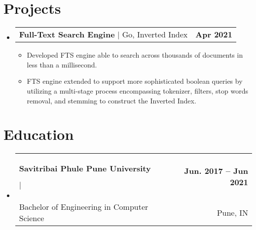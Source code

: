 \documentclass[letterpaper,11pt]{article}
\makeatletter
\newcommand{\resumeItem}[1]{
  \item\small{
    {#1 \vspace{-2pt}}
  }
}
\newcommand{\resumeSubheading}[5]{
  \vspace{-2pt}\item
    \begin{tabular*}{1.0\textwidth}[t]{l@{\extracolsep{\fill}}r}
      \textbf{#1}

        \if\relax\detokenize{#2}\relax
        \else
            $|$ \small{#2}
        \fi

        & \textbf{\small #3} \\
        {\small#4} & {\small #5} \\
    \end{tabular*}\vspace{-7pt}
}
\newcommand{\resumeProjectHeading}[2]{
    \item
    \begin{tabular*}{1.001\textwidth}{l@{\extracolsep{\fill}}r}
      \small#1 & \textbf{\small #2}\\
    \end{tabular*}\vspace{-7pt}
}
\newcommand{\resumeSubHeadingListStart}{\begin{itemize}[leftmargin=0.0in, label={}]}
\newcommand{\resumeSubHeadingListEnd}{\end{itemize}}
\newcommand{\resumeItemListStart}{\begin{itemize}}
\newcommand{\resumeItemListEnd}{\end{itemize}\vspace{-5pt}}
\makeatother
\begin{document}
\section{Projects}
    \vspace{-5pt}
    \resumeSubHeadingListStart
      \resumeProjectHeading
          {\textbf{Full-Text Search Engine} $|$ {Go, Inverted Index}}{Apr 2021}
          \resumeItemListStart
            \resumeItem{Developed FTS engine able to search across thousands of documents in less than a millisecond.}
            \resumeItem{FTS engine extended to support more sophisticated boolean queries by utilizing a multi-stage process encompassing tokenizer, filters, stop words removal, and stemming to construct the Inverted Index.}
          \resumeItemListEnd
    \resumeSubHeadingListEnd
\vspace{-15pt}

\section{Education}
  \resumeSubHeadingListStart
    \resumeSubheading
      {Savitribai Phule Pune University}{}{Jun. 2017 -- Jun 2021}
      {Bachelor of Engineering in Computer Science}{Pune, IN}
  \resumeSubHeadingListEnd

\end{document}
